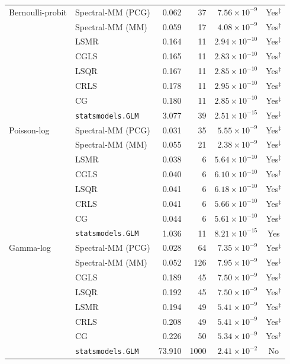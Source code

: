 \documentclass[10pt,a4paper]{article}
\begin{document}
\begin{longtable}{llrrrc}
\midrule
Bernoulli-probit & Spectral-MM (PCG) & 0.062 & 37 & $7.56\times10^{-9}$ & Yes$^{\ddagger}$ \\
 & Spectral-MM (MM) & 0.059 & 17 & $4.08\times10^{-9}$ & Yes$^{\ddagger}$ \\
 & LSMR & 0.164 & 11 & $2.94\times10^{-10}$ & Yes$^{\ddagger}$ \\
 & CGLS & 0.165 & 11 & $2.83\times10^{-10}$ & Yes$^{\ddagger}$ \\
 & LSQR & 0.167 & 11 & $2.85\times10^{-10}$ & Yes$^{\ddagger}$ \\
 & CRLS & 0.178 & 11 & $2.95\times10^{-10}$ & Yes$^{\ddagger}$ \\
 & CG & 0.180 & 11 & $2.85\times10^{-10}$ & Yes$^{\ddagger}$ \\
 & \texttt{statsmodels.GLM} & 3.077 & 39 & $2.51\times10^{-15}$ & Yes$^{\ddagger}$ \\
\midrule
Poisson-log & Spectral-MM (PCG) & 0.031 & 35 & $5.55\times10^{-9}$ & Yes$^{\ddagger}$ \\
 & Spectral-MM (MM) & 0.055 & 21 & $2.38\times10^{-9}$ & Yes$^{\ddagger}$ \\
 & LSMR & 0.038 & 6 & $5.64\times10^{-10}$ & Yes$^{\ddagger}$ \\
 & CGLS & 0.040 & 6 & $6.10\times10^{-10}$ & Yes$^{\ddagger}$ \\
 & LSQR & 0.041 & 6 & $6.18\times10^{-10}$ & Yes$^{\ddagger}$ \\
 & CRLS & 0.041 & 6 & $5.66\times10^{-10}$ & Yes$^{\ddagger}$ \\
 & CG & 0.044 & 6 & $5.61\times10^{-10}$ & Yes$^{\ddagger}$ \\
 & \texttt{statsmodels.GLM} & 1.036 & 11 & $8.21\times10^{-15}$ & Yes \\
\midrule
Gamma-log & Spectral-MM (PCG) & 0.028 & 64 & $7.35\times10^{-9}$ & Yes$^{\ddagger}$ \\
 & Spectral-MM (MM) & 0.052 & 126 & $7.95\times10^{-9}$ & Yes$^{\ddagger}$ \\
 & CGLS & 0.189 & 45 & $7.50\times10^{-9}$ & Yes$^{\ddagger}$ \\
 & LSQR & 0.192 & 45 & $7.50\times10^{-9}$ & Yes$^{\ddagger}$ \\
 & LSMR & 0.194 & 49 & $5.41\times10^{-9}$ & Yes$^{\ddagger}$ \\
 & CRLS & 0.208 & 49 & $5.41\times10^{-9}$ & Yes$^{\ddagger}$ \\
 & CG & 0.226 & 50 & $5.34\times10^{-9}$ & Yes$^{\ddagger}$ \\
 & \texttt{statsmodels.GLM} & 73.910 & 1000 & $2.41\times10^{-2}$ & No \\

\end{longtable}
\end{document}
